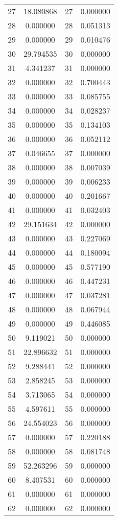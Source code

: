 \documentclass[12pt]{article}
\begin{document}
\begin{longtable}{@{}cccc@{}}
27 & 18.080868 & 27 & 0.000000 \\
28 & 0.000000 & 28 & 0.051313 \\
29 & 0.000000 & 29 & 0.010476 \\
30 & 29.794535 & 30 & 0.000000 \\
31 & 4.341237 & 31 & 0.000000 \\
32 & 0.000000 & 32 & 0.700443 \\
33 & 0.000000 & 33 & 0.085755 \\
34 & 0.000000 & 34 & 0.028237 \\
35 & 0.000000 & 35 & 0.134103 \\
36 & 0.000000 & 36 & 0.052112 \\
37 & 0.046655 & 37 & 0.000000 \\
38 & 0.000000 & 38 & 0.007039 \\
39 & 0.000000 & 39 & 0.006233 \\
40 & 0.000000 & 40 & 0.201667 \\
41 & 0.000000 & 41 & 0.032403 \\
42 & 29.151634 & 42 & 0.000000 \\
43 & 0.000000 & 43 & 0.227069 \\
44 & 0.000000 & 44 & 0.180094 \\
45 & 0.000000 & 45 & 0.577190 \\
46 & 0.000000 & 46 & 0.447231 \\
47 & 0.000000 & 47 & 0.037281 \\
48 & 0.000000 & 48 & 0.067944 \\
49 & 0.000000 & 49 & 0.446085 \\
50 & 9.119021 & 50 & 0.000000 \\
51 & 22.896632 & 51 & 0.000000 \\
52 & 9.288441 & 52 & 0.000000 \\
53 & 2.858245 & 53 & 0.000000 \\
54 & 3.713065 & 54 & 0.000000 \\
55 & 4.597611 & 55 & 0.000000 \\
56 & 24.554023 & 56 & 0.000000 \\
57 & 0.000000 & 57 & 0.220188 \\
58 & 0.000000 & 58 & 0.081748 \\
59 & 52.263296 & 59 & 0.000000 \\
60 & 8.407531 & 60 & 0.000000 \\
61 & 0.000000 & 61 & 0.000000 \\
62 & 0.000000 & 62 & 0.000000 \\

\end{longtable}
\end{document}
